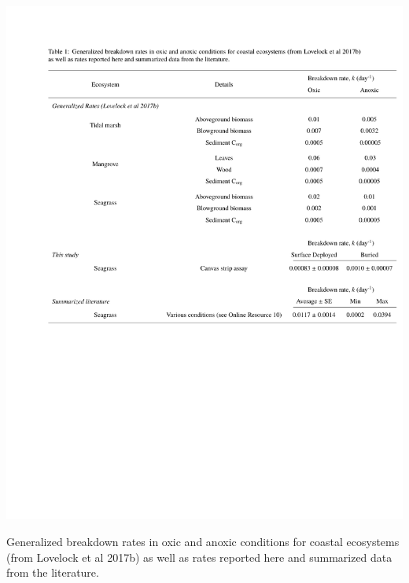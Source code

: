 \begin{table}[t]
  \centering
  \includegraphics[width=.97\textwidth,clip, trim={2.5cm 10.0cm 0.3cm 3.2cm}]{Figures/chapter2/Tsummary}
\caption[Generalized breakdown rates in oxic and anoxic conditions for coastal ecosystems (from Lovelock et al 2017b) as well as rates reported here and summarized data from the literature.]{Generalized breakdown rates in oxic and anoxic conditions for coastal ecosystems (from Lovelock et al 2017b) as well as rates reported here and summarized data from the literature.}
  \label{table:2T2}
\end{table}

